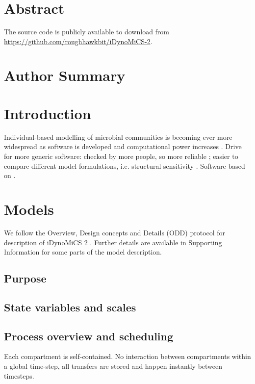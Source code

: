 \documentclass[10pt,letterpaper]{article}
\begin{document}
\section*{Abstract}


The source code is publicly available to download from \url{https://github.com/roughhawkbit/iDynoMiCS-2}.

\section*{Author Summary}

\linenumbers

\section*{Introduction}
Individual-based modelling of microbial communities is becoming ever more widespread as software is developed and computational power increases \cite{ferrer2008}.
Drive for more generic software:
checked by more people, so more reliable \cite{joppa2013};
easier to compare different model formulations, i.e. structural sensitivity \cite{adamson2013}.
Software based on \cite{bacsim, idyno1}.

\section*{Models}
We follow the Overview, Design concepts and Details (ODD) protocol for description of iDynoMiCS 2 \cite{oddprotocol}. Further details are available in Supporting Information for some parts of the model description.

\subsection*{Purpose}


\subsection*{State variables and scales}


\subsection*{Process overview and scheduling}
Each compartment is self-contained.
No interaction between compartments within a global time-step, all transfers are stored and happen instantly between timesteps.
\end{document}
